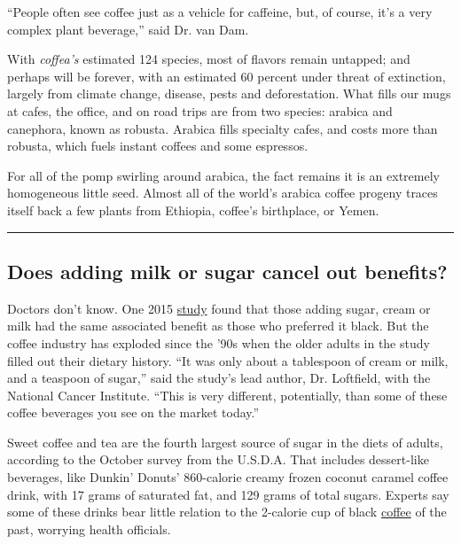 ``People often see coffee just as a vehicle for caffeine, but, of
course, it's a very complex plant beverage,'' said Dr. van Dam.

With \emph{coffea's} estimated 124 species, most of flavors remain
untapped; and perhaps will be forever, with an estimated 60 percent
under threat of extinction, largely from climate change, disease, pests
and deforestation. What fills our mugs at cafes, the office, and on road
trips are from two species: arabica and canephora, known as robusta.
Arabica fills specialty cafes, and costs more than robusta, which fuels
instant coffees and some espressos.

For all of the pomp swirling around arabica, the fact remains it is an
extremely homogeneous little seed. Almost all of the world's arabica
coffee progeny traces itself back a few plants from Ethiopia, coffee's
birthplace, or Yemen.

\begin{center}\rule{0.5\linewidth}{\linethickness}\end{center}

\hypertarget{does-adding-milk-or-sugar-cancel-out-benefits}{%
\subsection{Does adding milk or sugar cancel out
benefits?}\label{does-adding-milk-or-sugar-cancel-out-benefits}}

Doctors don't know. One 2015
\href{https://www.ncbi.nlm.nih.gov/pmc/articles/PMC5875735/}{study}
found that those adding sugar, cream or milk had the same associated
benefit as those who preferred it black. But the coffee industry has
exploded since the '90s when the older adults in the study filled out
their dietary history. ``It was only about a tablespoon of cream or
milk, and a teaspoon of sugar,'' said the study's lead author, Dr.
Loftfield, with the National Cancer Institute. ``This is very different,
potentially, than some of these coffee beverages you see on the market
today.''

Sweet coffee and tea are the fourth largest source of sugar in the diets
of adults, according to the October survey from the U.S.D.A. That
includes dessert-like beverages, like Dunkin' Donuts' 860-calorie creamy
frozen coconut caramel coffee drink, with 17 grams of saturated fat, and
129 grams of total sugars. Experts say some of these drinks bear little
relation to the 2-calorie cup of black
\href{https://fdc.nal.usda.gov/fdc-app.html\#_blank}{coffee} of the
past, worrying health officials.

